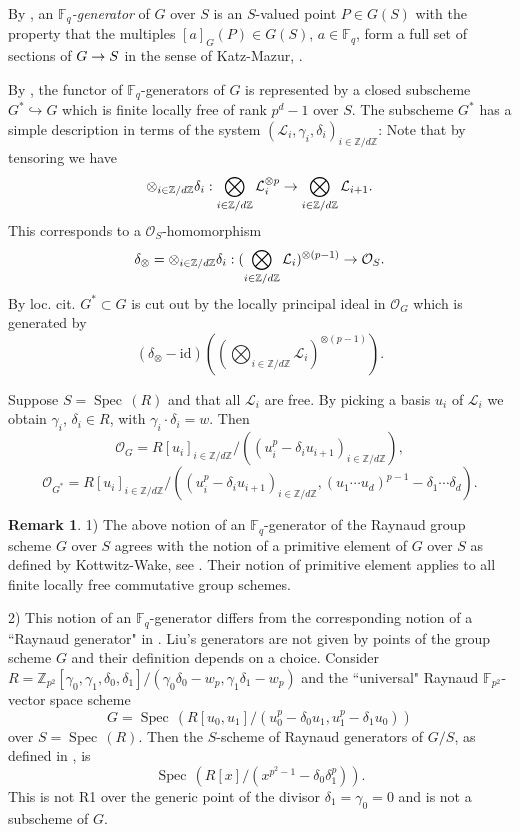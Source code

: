 \documentclass[reqno, 10pt]{amsart}
\makeatletter
\newcommand{\BF}{\ensuremath{\mathbb {F}}\xspace}
\newcommand{\BZ}{\ensuremath{\mathbb {Z}}\xspace}
\newcommand{\CL}{\ensuremath{\mathcal {L}}\xspace}
\newcommand{\CO}{\ensuremath{\mathcal {O}}\xspace}
\newcommand{\id}{\ensuremath{\mathrm{id}}\xspace}
\DeclareMathOperator{\Spec}{Spec\,}
\theoremstyle{definition}
\newtheorem{remark}[subsubsection]{Remark}
\numberwithin{equation}{subsection}
\numberwithin{subsubsection}{subsection}
\renewcommand{\to}{%
   \ifbool{@display}{\longrightarrow}{\rightarrow}%
   }
\newcommand{\ga}{\gamma}
\newcommand{\de}{\delta}
\makeatother
\begin{document}
By \cite[\S 5]{P95}, an \emph{$\BF_q$-generator} of $G$ over $S$   is an $S$-valued point $P\in G(S)$ with the property that the multiples $[a]_G(P)\in G(S)$, $a\in \BF_q$, form a full set of sections of $G\to S$ in the sense of Katz-Mazur, \cite{KatzMazur}.

By \cite[Prop. 5.1.5]{P95}, the functor of $\BF_q$-generators of $G$ is represented by a closed subscheme $G^*\hookrightarrow G$ which is finite locally free of rank $p^d-1$ over $S$. The subscheme $G^*$ has a simple description in terms of the system  $(\CL_i, \ga_i, \de_i)_{i\in \BZ/d\BZ}$: Note that by tensoring we have
\[
\otimes_{i\in \BZ/d\BZ} \de_i:  \bigotimes_{i\in \BZ/d\BZ}  \CL_i^{\otimes p}\to \bigotimes_{i\in \BZ/d\BZ}  \CL_{i+1}.
\]
This corresponds to a  $\CO_S$-homomorphism
\[
\delta_{\otimes} =\otimes_{i\in \BZ/d\BZ} \de_i: ( \bigotimes_{i\in \BZ/d\BZ}  \CL_i)^{\otimes (p-1)}\to   \CO_S.
\]
By loc. cit. $G^*\subset G$ is cut out by the locally principal ideal in $\CO_G$ which is generated by 
\[
(\delta_\otimes-\id )((\bigotimes_{i\in \BZ/d\BZ} \CL_i)^{\otimes(p-1)}).
\]

Suppose $S=\Spec(R)$ and that all $\CL_i$ are free. By picking a basis $u_i$ of $\CL_i$ we obtain $\ga_i$, $\de_i\in R$, with $\ga_i\cdot \de_i=w$. Then
\[
\CO_G=R[u_i]_{i\in \BZ/d\BZ}/((u_{i}^p-\de_{i}u_{i+1})_{i\in \BZ/d\BZ}), 
\]
\[
 \CO_{G^*}=R[u_i]_{i\in \BZ/d\BZ}/((u_{i}^p-\de_{i}u_{i+1})_{i\in \BZ/d\BZ}, (u_1\cdots u_d)^{p-1}-\de_1\cdots \de_d).
\]

\begin{remark}\label{rem:Generators}
1) The above notion of an $\BF_q$-generator of the Raynaud group scheme $G$ over $S$ agrees with the notion of a primitive element of $G$ over $S$ as defined by Kottwitz-Wake, see  \cite[\S 1.5]{KoWa}. Their notion of primitive element applies to all finite locally free commutative group schemes.

2) This notion of an $\BF_q$-generator differs from the corresponding notion of a ``Raynaud generator" in \cite[Def. 3.4]{SLiu}. Liu's generators are not given by points of the group scheme $G$ and their definition depends on a choice.
Consider $R=\BZ_{p^2}[\gamma_0,\gamma_1,\delta_0,\delta_1]/(\gamma_0\delta_0-w_p, \gamma_1\delta_1-w_p)$ and the ``universal" Raynaud $\BF_{p^2}$-vector space scheme 
\[
G=\Spec(R[u_0, u_1]/(u_0^p-\delta_0u_1, u_1^p-\delta_1u_0))
\] 
over $S=\Spec(R)$. Then the $S$-scheme of Raynaud generators of $G/S$, as defined in \cite[Def. 3.4]{SLiu}, is 
\[
\Spec(R[x ]/(x ^{p^2-1}-\delta_0\delta_1^p)).
\]
This is not R1 over the generic point of the divisor $\delta_1=\gamma_0=0$ and is not a subscheme of $G$.
\end{remark}
\end{document}
